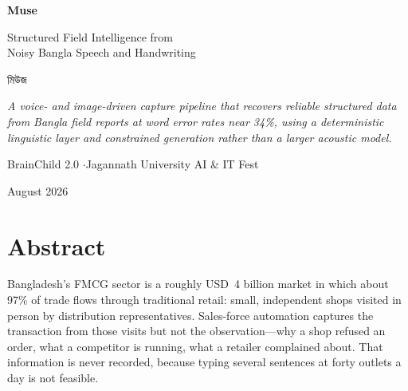 \documentclass[11pt,a4paper]{article}
\newcommand{\bng}[1]{{\bn #1}}
\begin{document}
\begin{titlepage}
\centering
\vspace*{3.2cm}

{\Huge\bfseries\color{ink} Muse\par}
\vspace{0.4cm}
{\LARGE\color{accent} Structured Field Intelligence from\\[2mm] Noisy Bangla Speech and Handwriting\par}

\vspace{1.0cm}
{\large\bng{মিউজ}\par}

\vspace{2.0cm}
\begin{minipage}{0.82\textwidth}
\centering\itshape\color{muted}
A voice- and image-driven capture pipeline that recovers reliable structured
data from Bangla field reports at word error rates near 34\%, using a
deterministic linguistic layer and constrained generation rather than a larger
acoustic model.
\end{minipage}

\vfill
{\color{muted}\small BrainChild 2.0 \quad$\cdot$\quad Jagannath University AI \& IT Fest\par}
{\color{muted}\small August 2026\par}
\end{titlepage}

\section*{Abstract}
\noindent
Bangladesh's FMCG sector is a roughly USD~4 billion market in which about 97\%
of trade flows through traditional retail: small, independent shops visited in
person by distribution representatives. Sales-force automation captures the
transaction from those visits but not the observation---why a shop refused an
order, what a competitor is running, what a retailer complained about. That
information is never recorded, because typing several sentences at forty
outlets a day is not feasible.
\end{document}
